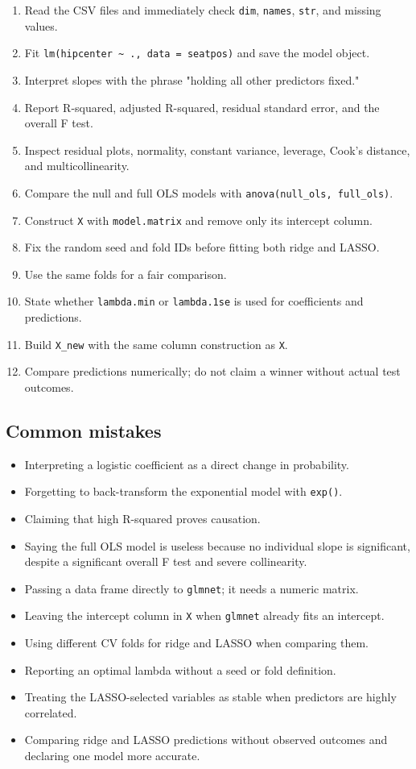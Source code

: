 ﻿\documentclass[11pt]{article}
\begin{document}
\begin{enumerate}
\item Read the CSV files and immediately check \texttt{dim}, \texttt{names}, \texttt{str}, and missing
values.
\item Fit \texttt{lm(hipcenter \textasciitilde{} ., data = seatpos)} and save the model object.
\item Interpret slopes with the phrase "holding all other predictors fixed."
\item Report R-squared, adjusted R-squared, residual standard error, and the overall
F test.
\item Inspect residual plots, normality, constant variance, leverage, Cook's
distance, and multicollinearity.
\item Compare the null and full OLS models with \texttt{anova(null\_ols, full\_ols)}.
\item Construct \texttt{X} with \texttt{model.matrix} and remove only its intercept column.
\item Fix the random seed and fold IDs before fitting both ridge and LASSO.
\item Use the same folds for a fair comparison.
\item State whether \texttt{lambda.min} or \texttt{lambda.1se} is used for coefficients and
predictions.
\item Build \texttt{X\_new} with the same column construction as \texttt{X}.
\item Compare predictions numerically; do not claim a winner without actual test
outcomes.
\end{enumerate}

\subsection{Common mistakes}

\begin{itemize}
\item Interpreting a logistic coefficient as a direct change in probability.
\item Forgetting to back-transform the exponential model with \texttt{exp()}.
\item Claiming that high R-squared proves causation.
\item Saying the full OLS model is useless because no individual slope is significant,
despite a significant overall F test and severe collinearity.
\item Passing a data frame directly to \texttt{glmnet}; it needs a numeric matrix.
\item Leaving the intercept column in \texttt{X} when \texttt{glmnet} already fits an intercept.
\item Using different CV folds for ridge and LASSO when comparing them.
\item Reporting an optimal lambda without a seed or fold definition.
\item Treating the LASSO-selected variables as stable when predictors are highly
correlated.
\item Comparing ridge and LASSO predictions without observed outcomes and declaring
one model more accurate.
\end{itemize}
\end{document}
